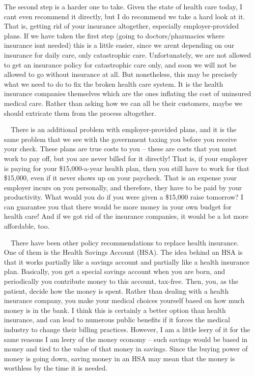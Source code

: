 The second step is a harder one to take. Given the state of health care
today, I can{\textquotesingle}t even recommend it directly, but I do
recommend we take a hard look at it. That is, getting rid of your
insurance altogether, especially employer-provided plans.
 If we have taken the
first step (going to doctors/pharmacies where insurance
isn{\textquotesingle}t needed) this is a little easier, since we
aren{\textquotesingle}t depending on our insurance for daily care, only
catastrophic care.  Unfortunately, we are not allowed to get an
insurance policy for catastrophic care only, and soon we will not be
allowed to go without insurance at all.  But nonetheless, this may be
precisely what we need to do to fix the broken health care system.  It
is the health insurance companies themselves which are the ones
inflating the cost of uninsured medical care.  Rather than asking how
we can all be their customers, maybe we should extricate them from the
process altogether.


\ \ There is an additional problem with employer-provided plans, and it
is the same problem that we see with the government taxing you before
you receive your check.  These plans are true costs to you – these are
costs that you must work to pay off, but you are never billed for it
directly!  That is, if your employer is paying for your \$15,000-a-year
health plan, then you still have to work for that \$15,000, even if it
never shows up on your paycheck. That is an expense your employer
incurs on you personally, and therefore,
they
have to be paid by
your productivity. What would you do if you were given a \$15,000 raise
tomorrow?  I can guarantee you that there would be more money in your
own budget for health care!  And if we got rid of the insurance
companies, it would be a lot more affordable, too.


\ \ There have been other policy recommendations to replace health
insurance.  One of them is the Health Savings Account (HSA).  The idea
behind an HSA is that it works partially like a savings account and
partially like a health insurance plan.  Basically, you get a special
savings account when you are born, and periodically you contribute
money to this account, tax-free.  Then, you, as the patient, decide how
the money is spent.  Rather than dealing with a health insurance
company, you make your medical choices yourself based on how much money
is in the bank.  I think this is certainly a better option than health
insurance, and can lead to numerous public benefits if it forces the
medical industry to change their billing practices.  However, I am a
little leery of it for the same reasons I am leery of the money economy
– such savings would be based in money and tied to the value of that
money in savings.  Since the buying power of money is going down,
saving money in an HSA may mean that the money is worthless by the time
it is needed.


